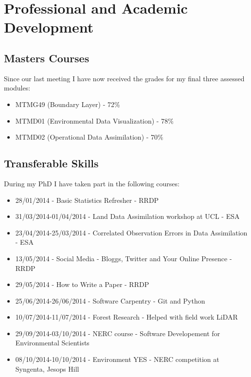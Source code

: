 \documentclass[11pt]{article}
\begin{document}
\section{Professional and Academic Development}

\subsection{Masters Courses}
Since our last meeting I have now received the grades for my final three assessed modules:
\begin{itemize}
\item MTMG49 (Boundary Layer) - 72\%
\item MTMD01 (Environmental Data Visualization) - 78\%
\item MTMD02 (Operational Data Assimilation) - 70\%
\end{itemize}

\subsection{Transferable Skills}

During my PhD I have taken part in the following courses:
\begin{itemize}
\item 28/01/2014 - Basic Statistics Refresher - RRDP

\item 31/03/2014-01/04/2014 - Land Data Assimilation workshop at UCL - ESA

\item 23/04/2014-25/03/2014 - Correlated Observation Errors in Data Assimilation - ESA

\item 13/05/2014 - Social Media - Bloggs, Twitter and Your Online Presence - RRDP

\item 29/05/2014 - How to Write a Paper - RRDP

\item 25/06/2014-26/06/2014 - Software Carpentry - Git and Python

\item 10/07/2014-11/07/2014 - Forest Research - Helped with field work LiDAR 

\item 29/09/2014-03/10/2014 - NERC course - Software Developement for Environmental Scientists

\item 08/10/2014-10/10/2014 - Environment YES - NERC competition at Syngenta, Jesops Hill
\end{itemize}
\end{document}
